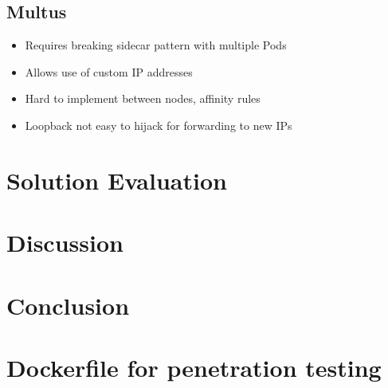\documentclass[english, 12pt, a4paper, sci, utf8, a-2b, online]{aaltothesis}
\begin{document}
\subsection{Multus}

\begin{itemize}
  \item Requires breaking sidecar pattern with multiple Pods
  \item Allows use of custom IP addresses
  \item Hard to implement between nodes, affinity rules
  \item Loopback not easy to hijack for forwarding to new IPs
\end{itemize}

\clearpage

\section{Solution Evaluation} \label{sec:solution}

\clearpage

\section{Discussion} \label{sec:discussion}

\clearpage

\section{Conclusion} \label{sec:conclusion}

\clearpage

\thesisbibliography
\printbibliography

\clearpage

\thesisappendix

\section{Dockerfile for penetration testing} \label{app:malicious-sidecar}
\end{document}
